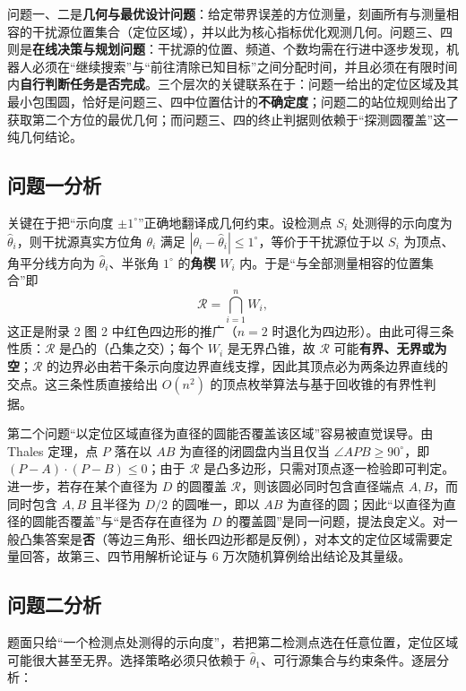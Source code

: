 \documentclass[withoutpreface,bwprint]{cumcmthesis}
\begin{document}
问题一、二是\textbf{几何与最优设计问题}：给定带界误差的方位测量，刻画所有与测量相容的干扰源位置集合（定位区域），并以此为核心指标优化观测几何。问题三、四则是\textbf{在线决策与规划问题}：干扰源的位置、频道、个数均需在行进中逐步发现，机器人必须在“继续搜索”与“前往清除已知目标”之间分配时间，并且必须在有限时间内\textbf{自行判断任务是否完成}。三个层次的关键联系在于：问题一给出的定位区域及其最小包围圆，恰好是问题三、四中位置估计的\textbf{不确定度}；问题二的站位规则给出了获取第二个方位的最优几何；而问题三、四的终止判据则依赖于“探测圆覆盖”这一纯几何结论。

\subsection{问题一分析}

关键在于把“示向度 $\pm1^{\circ}$”正确地翻译成几何约束。设检测点 $S_i$ 处测得的示向度为 $\hat\theta_i$，则干扰源真实方位角 $\theta_i$ 满足 $|\theta_i-\hat\theta_i|\le 1^{\circ}$，等价于干扰源位于以 $S_i$ 为顶点、角平分线方向为 $\hat\theta_i$、半张角 $1^{\circ}$ 的\textbf{角楔} $W_i$ 内。于是“与全部测量相容的位置集合”即
\[
\mathcal{R}=\bigcap_{i=1}^{n} W_i,
\]
这正是附录 2 图 2 中红色四边形的推广（$n=2$ 时退化为四边形）。由此可得三条性质：$\mathcal{R}$ 是凸的（凸集之交）；每个 $W_i$ 是无界凸锥，故 $\mathcal{R}$ 可能\textbf{有界、无界或为空}；$\mathcal{R}$ 的边界必由若干条示向度边界直线支撑，因此其顶点必为两条边界直线的交点。这三条性质直接给出 $O(n^2)$ 的顶点枚举算法与基于回收锥的有界性判据。

第二个问题“以定位区域直径为直径的圆能否覆盖该区域”容易被直觉误导。由 Thales 定理，点 $P$ 落在以 $AB$ 为直径的闭圆盘内当且仅当 $\angle APB\ge90^{\circ}$，即 $(P-A)\cdot(P-B)\le0$；由于 $\mathcal{R}$ 是凸多边形，只需对顶点逐一检验即可判定。进一步，若存在某个直径为 $D$ 的圆覆盖 $\mathcal{R}$，则该圆必同时包含直径端点 $A,B$，而同时包含 $A,B$ 且半径为 $D/2$ 的圆唯一，即以 $AB$ 为直径的圆；因此“以直径为直径的圆能否覆盖”与“是否存在直径为 $D$ 的覆盖圆”是同一问题，提法良定义。对一般凸集答案是\textbf{否}（等边三角形、细长四边形都是反例），对本文的定位区域需要定量回答，故第三、四节用解析论证与 6 万次随机算例给出结论及其量级。

\subsection{问题二分析}

题面只给“一个检测点处测得的示向度”，若把第二检测点选在任意位置，定位区域可能很大甚至无界。选择策略必须只依赖于 $\hat\theta_1$、可行源集合与约束条件。逐层分析：
\end{document}
